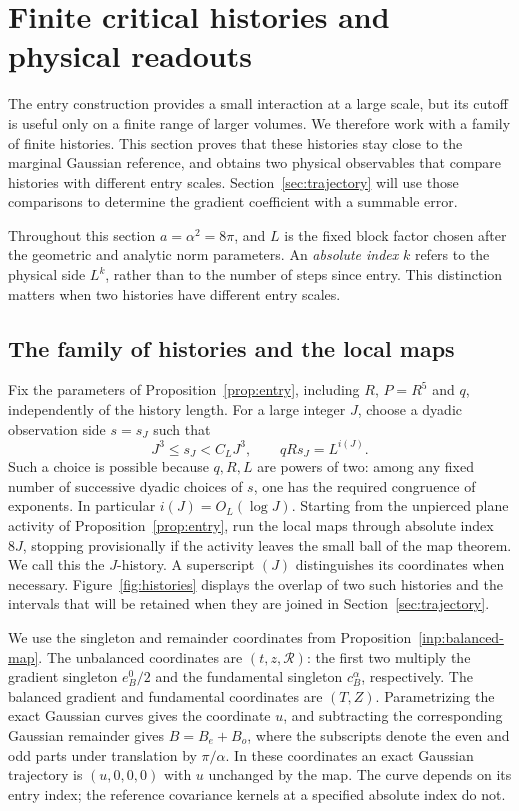 \section{Finite critical histories and physical readouts}
\label{sec:bulk}

The entry construction provides a small interaction at a large scale, but
its cutoff is useful only on a finite range of larger volumes.  We therefore
work with a family of finite histories.  This section proves that these
histories stay close to the marginal Gaussian reference, and obtains two
physical observables that compare histories with different entry scales.
Section~\ref{sec:trajectory} will use those comparisons to determine the
gradient coefficient with a summable error.

Throughout this section $a=\alpha^2=8\pi$, and $L$ is the fixed block
factor chosen after the geometric and analytic norm parameters.  An
\emph{absolute index} $k$ refers to the physical side $L^k$, rather than
to the number of steps since entry.  This distinction matters when two
histories have different entry scales.

\subsection{The family of histories and the local maps}

Fix the parameters of Proposition~\ref{prop:entry}, including $R$, $P=R^5$
and $q$, independently of the history length.  For a large integer $J$,
choose a dyadic observation side $s=s_J$ such that
\begin{equation}\label{eq:bulk-entry-scale}
 J^3\le s_J<C_LJ^3,\qquad qRs_J=L^{i(J)}.
\end{equation}
Such a choice is possible because $q,R,L$ are powers of two: among any
fixed number of successive dyadic choices of $s$, one has the required
congruence of exponents.  In particular $i(J)=O_L(\log J)$.  Starting
from the unpierced plane activity of Proposition~\ref{prop:entry}, run
the local maps through absolute index $8J$, stopping provisionally if
the activity leaves the small ball of the map theorem.  We call this
the $J$-history.  A superscript $(J)$ distinguishes its coordinates
when necessary.
Figure~\ref{fig:histories} displays the overlap of two such histories
and the intervals that will be retained when they are joined in
Section~\ref{sec:trajectory}.



We use the singleton and remainder coordinates from
Proposition~\ref{inp:balanced-map}.  The unbalanced coordinates are
$(t,z,\mathcal R)$: the first two multiply the gradient singleton
$e_B^0/2$ and the fundamental singleton $c_B^\alpha$, respectively.
The balanced gradient and fundamental coordinates are $(T,Z)$.
Parametrizing the exact Gaussian curves gives the coordinate $u$, and
subtracting the corresponding Gaussian remainder gives $B=B_e+B_o$,
where the subscripts denote the even and odd parts under translation
by $\pi/\alpha$.  In these coordinates an exact Gaussian trajectory
is $(u,0,0,0)$ with $u$ unchanged by the map.  The curve depends on its
entry index; the reference covariance kernels at a specified absolute
index do not.

